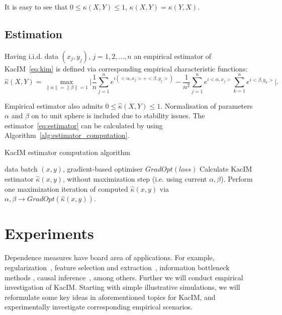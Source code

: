 \documentclass{article}
\begin{document}
\noindent It is easy to see that $0 \leq \kappa(X,Y) \leq 1$, $\kappa(X,Y) = \kappa(Y,X)$. 

\subsection{Estimation}

Having i.i.d. data $(x_{j}, y_{j})$, $j = 1,2,...,n$ an empirical estimator of KacIM~\eqref{eq:kim} is defined via corresponding empirical characteristic functions:
\begin{equation}
\label{eq:estimator}
    \hat{\kappa}(X,Y) = \max_{\|\alpha\| = \|\beta\| = 1} \vert \frac{1}{n} \sum_{j=1}^{n} e^{i(<\alpha, x_{j}> + <\beta, y_{j}>) } - \frac{1}{n^2} \sum_{j=1}^{n} e^{i <\alpha, x_{j}>}\sum_{k=1}^{n} e^{i<\beta, y_{k}>}\vert.
\end{equation}

\noindent Empirical estimator also admits $0 \leq \hat{\kappa}(X,Y) \leq 1$. Normalisation of parameters $\alpha$ and $\beta$ on to unit sphere is included due to stability issues. The  estimator~\eqref{eq:estimator} can be calculated by using Algorithm~\ref{alg:estimator_computation}.

\begin{algorithm}
\caption{KacIM estimator computation algorithm}\label{alg:estimator_computation}
\begin{algorithmic}
\Require data batch $(x,y)$, gradient-based optimiser $GradOpt(loss)$
\State Calculate KacIM estimator $\hat{\kappa}(x,y)$, without maximization step (i.e. using current $\alpha, \beta$).
\State Perform one maximization iteration of computed $\hat{\kappa}(x,y)$ via $\alpha, \beta \rightarrow GradOpt(\hat{\kappa}(x,y))$.
\end{algorithmic}
\end{algorithm}

\section{Experiments}
Dependence measures have board area of applications. For example, regularization~\cite{?,?}, feature selection and extraction~\cite{?}, information bottleneck methods \cite{?}, causal inference~\cite{?}, among others. Further we will conduct empirical investigation of KacIM. Starting with simple illustrative simulations, we will reformulate some key ideas in aforementioned topics for KacIM, and experimentally investigate corresponding empirical scenarios.
\end{document}
